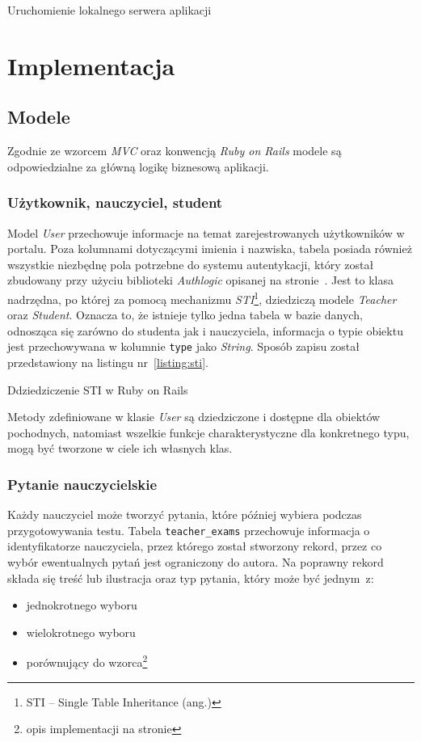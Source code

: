 \documentclass[a4paper,12pt]{article}
\begin{document}
\begin{listing}
  
  \caption{Uruchomienie lokalnego serwera aplikacji}
  \label{listing:ubuntu_start_server}
\end{listing}

\clearpage
\section{Implementacja}
\subsection{Modele}
Zgodnie ze wzorcem \emph{MVC} oraz konwencją \emph{Ruby on Rails} modele są odpowiedzialne
za główną logikę biznesową aplikacji.

\subsubsection{Użytkownik, nauczyciel, student}
Model \emph{User} przechowuje informacje na temat zarejestrowanych użytkowników w
portalu. Poza kolumnami dotyczącymi imienia i nazwiska, tabela posiada również wszystkie
niezbędnę pola potrzebne do systemu autentykacji, który został zbudowany przy użyciu
biblioteki \emph{Authlogic} opisanej na stronie~\pageref{sec:authlogic}. Jest to klasa
nadrzędna, po której za pomocą mechanizmu \emph{STI}\footnote{STI -- Single Table
Inheritance (ang.)}, dziedziczą modele \emph{Teacher} oraz \emph{Student}. Oznacza to, że
istnieje tylko jedna tabela w bazie danych, odnosząca się zarówno do studenta jak i
nauczyciela, informacja o typie obiektu jest przechowywana w kolumnie \texttt{type} jako
\emph{String}. Sposób zapisu został przedstawiony na listingu nr~\ref{listing:sti}.

\begin{listing}
  
  \caption{Ddziedziczenie STI w Ruby on Rails}
  \label{listing:sti}
\end{listing}


Metody zdefiniowane w klasie \emph{User} są dziedziczone i dostępne dla obiektów
pochodnych, natomiast wszelkie funkcje charakterystyczne dla konkretnego typu, mogą być
tworzone w ciele ich własnych klas.

\subsubsection{Pytanie nauczycielskie}
Każdy nauczyciel może tworzyć pytania, które później wybiera podczas przygotowywania
testu. Tabela \texttt{teacher\_exams} przechowuje informacja o identyfikatorze
nauczyciela, przez którego został stworzony rekord, przez co wybór ewentualnych pytań jest
ograniczony do autora.
Na poprawny rekord składa się treść lub ilustracja oraz typ pytania, który może być
jednym~z:
\begin{itemize}
  \item{jednokrotnego wyboru}
  \item{wielokrotnego wyboru}
  \item{porównujący do wzorca\footnote{opis implementacji na stronie \pageref{sec:levenshtein}}}
\end{itemize}
\end{document}
